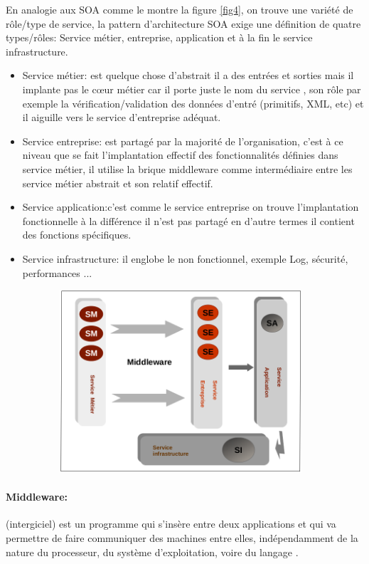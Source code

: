 \documentclass[12pt, a4paper, openany]{report}
\begin{document}
   En analogie aux SOA comme le montre la figure \ref{fig4}, on trouve une variété de rôle/type de service, la pattern d'architecture SOA exige une définition de quatre types/rôles: Service métier, entreprise, application et à la fin le service infrastructure.
   \begin{itemize}
      \item  Service métier: est quelque chose d’abstrait il a des entrées et sorties mais il implante pas le cœur métier car il porte juste le nom du service , son rôle par exemple la vérification/validation des données d’entré (primitifs, XML, etc) et il aiguille vers le service d'entreprise adéquat.
      \item  Service entreprise: est partagé par la majorité de l'organisation, c'est à ce niveau que se fait l'implantation effectif des fonctionnalités définies dans service métier, il utilise la brique middleware comme intermédiaire entre les service métier abstrait et son relatif effectif.
      \item  Service application:c'est comme le service entreprise on trouve l'implantation fonctionnelle à la différence il n'est pas partagé en d'autre termes il contient des fonctions spécifiques.
      \item  Service infrastructure: il englobe le non fonctionnel, exemple Log, sécurité, performances ...  
   \end{itemize}
    
   \begin{center}
     \includegraphics[width=13cm, height=6.8cm]{classif_soa_4.png}
     \label{fig4}
   \end{center}
   
   \paragraph{Middleware:} (intergiciel) est un programme qui s'insère entre deux applications et qui va permettre de faire communiquer des machines entre elles, indépendamment de la nature du processeur, du système d'exploitation, voire du langage \cite{refbibMiddle}. \\
   
\end{document}
